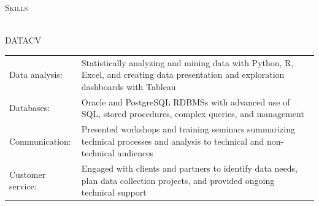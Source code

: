 \documentclass[letterpaper]{article}
\newcommand{\lineunder} {
        \vspace*{-8pt} \\
        \hspace*{-18pt} \hrulefill \\
    }
\newcommand{\header} [1] {
        {\hspace*{-18pt}\vspace*{6pt} \textsc{#1}}
        \vspace*{-6pt} \lineunder
        \vspace{1mm}
    }
\begin{document}
\header{Skills}
    \begin{taggedblock}{DATACV}
        \begin{tabular}[t]{ l L{5.17in} }
            Data analysis: &
                Statistically analyzing and mining data with
                Python, R, Excel, and 
                creating data presentation and exploration dashboards with Tableau
                \\
            Databases: & 
                Oracle and PostgreSQL RDBMSs with advanced use of SQL, stored
                procedures, complex queries, and management
                \\
            Communication: &
                Presented workshops and training seminars summarizing technical
                processes and analysis to technical and non-technical audiences
                \\
            Customer service: &
                Engaged with clients and partners to identify data needs, plan data
                collection projects, and provided ongoing technical support
                \\
        \end{tabular}
    \end{taggedblock}
\end{document}
